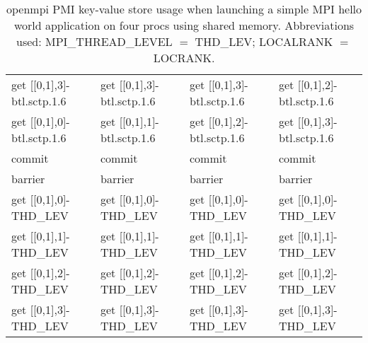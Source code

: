 \begin{table}
\begin{tabular}{|p{4cm}|p{4cm}|p{4cm}|p{4cm}|}
get [[0,1],3]-btl.sctp.1.6
 &  get [[0,1],3]-btl.sctp.1.6
 &  get [[0,1],3]-btl.sctp.1.6
 &  get [[0,1],2]-btl.sctp.1.6\\
get [[0,1],0]-btl.sctp.1.6
 &  get [[0,1],1]-btl.sctp.1.6
 &  get [[0,1],2]-btl.sctp.1.6
 &  get [[0,1],3]-btl.sctp.1.6\\
commit & commit & commit & commit \\  
barrier& barrier& barrier& barrier\\  
\hline
get [[0,1],0]-THD\_LEV
 &  get [[0,1],0]-THD\_LEV
 &  get [[0,1],0]-THD\_LEV
 &  get [[0,1],0]-THD\_LEV\\
get [[0,1],1]-THD\_LEV
 &  get [[0,1],1]-THD\_LEV
 &  get [[0,1],1]-THD\_LEV
 &  get [[0,1],1]-THD\_LEV\\
get [[0,1],2]-THD\_LEV
 &  get [[0,1],2]-THD\_LEV
 &  get [[0,1],2]-THD\_LEV
 &  get [[0,1],2]-THD\_LEV\\
get [[0,1],3]-THD\_LEV
 &  get [[0,1],3]-THD\_LEV
 &  get [[0,1],3]-THD\_LEV
 &  get [[0,1],3]-THD\_LEV\\
\hline
\end{tabular}
\caption{openmpi PMI key-value store usage when launching a simple 
MPI hello world application on four procs using shared memory.
Abbreviations used: MPI\_THREAD\_LEVEL $=$ THD\_LEV; LOCALRANK $=$ LOCRANK.
}
\label{tab:openmpi}
\end{table}

